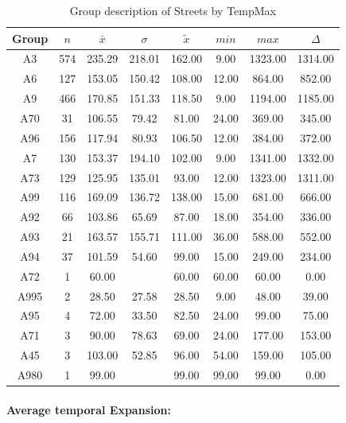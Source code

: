 \documentclass[a4paper,headsepline,footsepline,fontsize=11pt,BCOR=12mm,DIV=12]{report}
\begin{document}
\begin{table}[h]
	\small
	\centering
	\begin{tabular}{c|c|c|c|c|c|c|c}
		\toprule
		Group & $n$ & $\bar{x}$ & $\sigma$ & $\tilde{x}$ & $min$ & $max$ & $\Delta$ \\ 
		\midrule
		A3 & 574 & 235.29 & 218.01 & 162.00 & 9.00 & 1323.00 & 1314.00   \\ 
		A6 & 127 & 153.05 & 150.42 & 108.00 & 12.00 & 864.00 & 852.00   \\ 
		A9 & 466 & 170.85 & 151.33 & 118.50 & 9.00 & 1194.00 & 1185.00   \\ 
		A70 & 31 & 106.55 & 79.42 & 81.00 & 24.00 & 369.00 & 345.00   \\ 
		A96 & 156 & 117.94 & 80.93 & 106.50 & 12.00 & 384.00 & 372.00   \\ 
		A7 & 130 & 153.37 & 194.10 & 102.00 & 9.00 & 1341.00 & 1332.00  \\ 
		A73 & 129 & 125.95 & 135.01 & 93.00 & 12.00 & 1323.00 & 1311.00  \\ 
		A99 & 116 & 169.09 & 136.72 & 138.00 & 15.00 & 681.00 & 666.00  \\ 
		A92 & 66 & 103.86 & 65.69 & 87.00 & 18.00 & 354.00 & 336.00 \\ 
		A93 & 21 & 163.57 & 155.71 & 111.00 & 36.00 & 588.00 & 552.00   \\ 
		A94 & 37 & 101.59 & 54.60 & 99.00 & 15.00 & 249.00 & 234.00 \\ 
		A72 & 1 & 60.00 &  & 60.00 & 60.00 & 60.00 & 0.00 \\ 
		A995 & 2 & 28.50 & 27.58 & 28.50 & 9.00 & 48.00 & 39.00   \\ 
		A95 & 4 & 72.00 & 33.50 & 82.50 & 24.00 & 99.00 & 75.00  \\ 
		A71 & 3 & 90.00 & 78.63 & 69.00 & 24.00 & 177.00 & 153.00   \\ 
		A45 & 3 & 103.00 & 52.85 & 96.00 & 54.00 & 159.00 & 105.00   \\ 
		A980 & 1 & 99.00 &  & 99.00 & 99.00 & 99.00 & 0.00   \\ 
 		\bottomrule
	\end{tabular}
	\caption{Group description of Streets by TempMax}
\end{table}

\paragraph{Average temporal Expansion:}
\end{document}
